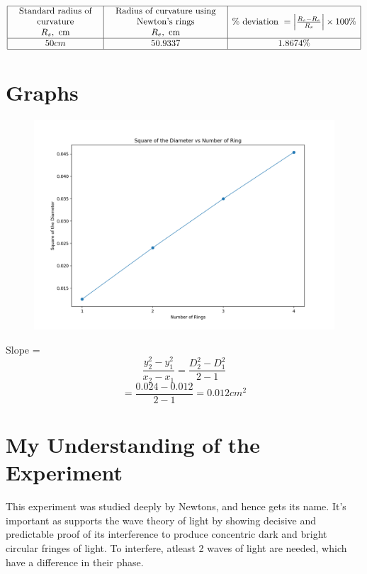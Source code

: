 \documentclass[11pt]{article}
\begin{document}
	$$
	\begin{array}{|c|c|c|}
		\hline \begin{array}{c}
			\text { Standard radius of } \\
			\text { curvature } \\
			R_{s}, \mathrm{~cm}
		\end{array} & \begin{array}{c}
			\text { Radius of curvature using } \\
			\text { Newton's rings } \\
			R_{e}, \mathrm{~cm}
		\end{array} & \% \text { deviation }=\left|\frac{R_{s}-R_{e}}{R_{s}}\right| \times 100 \% \\
		\hline 50 cm & 50.9337 & 1.8674  \% \\
		\hline
	\end{array}
	$$

	\clearpage

\section{Graphs}

		\begin{figure}[H]
		\centering
		\includegraphics[scale=0.6]{plot.png}
		\label{it}
		\end{figure}
	
	Slope = $$\frac{y_2^2 - y_1^2}{x_2 -x_1} = \frac{D_2^2 - D_1^2}{2 -1} $$
					$$ = \frac{0.024 - 0.012}{2-1} = 0.012 cm^2$$

	\section{My Understanding of the Experiment}
	This experiment was studied deeply by Newtons, and hence gets its name. It's important as supports the wave theory of light by showing decisive and predictable proof of its interference to produce concentric dark and bright circular fringes of light. To interfere, atleast 2 waves of light are needed, which have a difference in their phase. \\	
	
\end{document}

